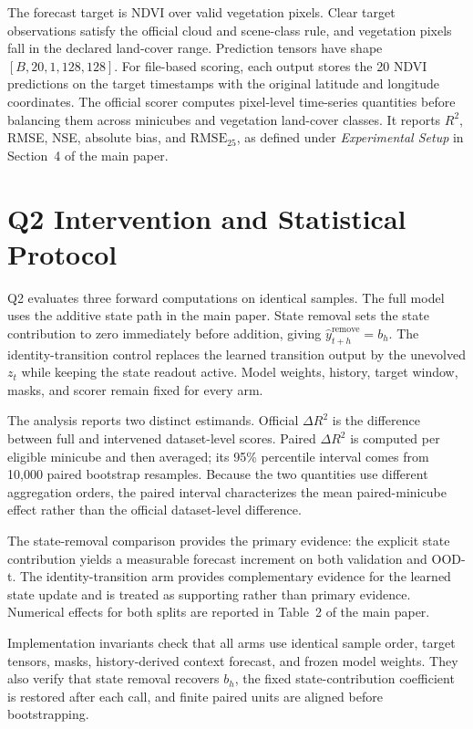 \documentclass[letterpaper]{article}
\begin{document}
The forecast target is NDVI over valid vegetation pixels. Clear target
observations satisfy the official cloud and scene-class rule, and vegetation
pixels fall in the declared land-cover range. Prediction tensors have shape
\([B,20,1,128,128]\). For file-based scoring, each output stores the 20 NDVI
predictions on the target timestamps with the original latitude and longitude
coordinates. The official scorer computes pixel-level time-series quantities
before balancing them across minicubes and vegetation land-cover classes. It
reports \(R^2\), RMSE, NSE, absolute bias, and \(\mathrm{RMSE}_{25}\), as
defined under \emph{Experimental Setup} in Section~4 of the main paper.

\section{Q2 Intervention and Statistical Protocol}
\label{sec:q2-results}

Q2 evaluates three forward computations on identical samples. The full model
uses the additive state path in the main paper. State removal sets the state
contribution to zero immediately before addition, giving
\(\widehat y^{\mathrm{remove}}_{t+h}=b_h\). The identity-transition control
replaces the learned transition output by the unevolved \(z_t\) while keeping
the state readout active. Model weights, history, target window, masks, and
scorer remain fixed for every arm.

The analysis reports two distinct estimands. Official
\(\Delta R^2\) is the difference between full and intervened dataset-level
scores. Paired \(\Delta R^2\) is computed per eligible minicube and then
averaged; its 95\% percentile interval comes from 10,000 paired bootstrap
resamples. Because the two quantities use different aggregation orders, the
paired interval characterizes the mean paired-minicube effect rather than the
official dataset-level difference.

The state-removal comparison provides the primary evidence: the explicit
state contribution yields a measurable forecast increment on both validation
and OOD-t. The identity-transition arm provides complementary evidence for
the learned state update and is treated as supporting rather than primary
evidence. Numerical effects for both splits are reported in Table~2 of the
main paper.

Implementation invariants check that all arms use identical sample order,
target tensors, masks, history-derived context forecast, and frozen
model weights. They also verify that state removal recovers \(b_h\), the fixed
state-contribution coefficient is restored after each call, and finite paired
units are aligned before bootstrapping.
\end{document}
